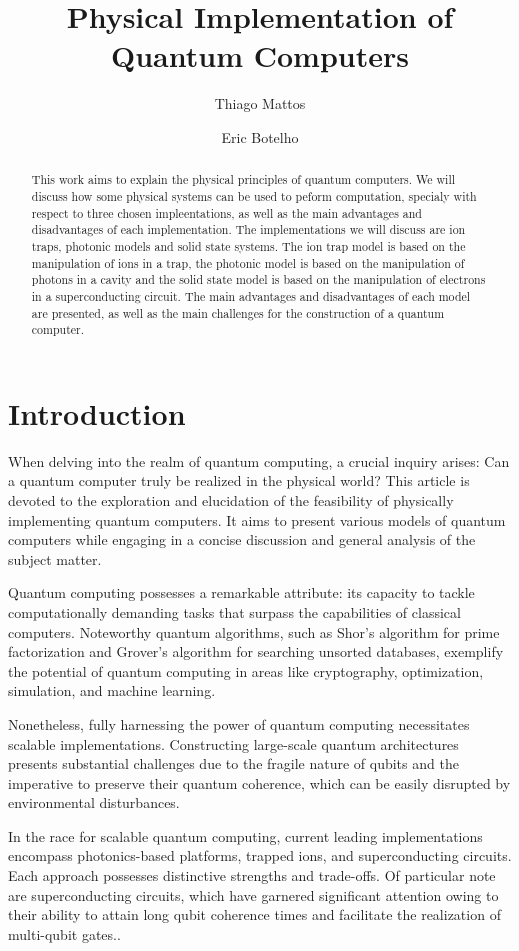 \documentclass[
  journal=largetwo,
  year=2023,
]{cup-journal}
\title{Physical Implementation of Quantum Computers}
\author{Thiago Mattos}
\affiliation{Universidade Federal de Minas Gerais, Departamento de Física, Belo Horizonte, 31270-901, Minas Gerais, Brazil}
\author{Eric Botelho}
\affiliation{Universidade Federal de Minas Gerais, Departamento de Física, Belo Horizonte, 31270-901, Minas Gerais, Brazil}
\begin{document}
\begin{abstract}
  This work aims to explain the physical principles of quantum computers. We will discuss how some physical systems can be used to peform computation, specialy with respect to three chosen impleentations, as well as the main advantages and disadvantages of each implementation.
  The implementations we will discuss are ion traps, photonic models and solid state systems. The ion trap model is based on the manipulation of ions in a trap, the photonic model is based on the manipulation of photons in a cavity and the solid state model is based on the manipulation of electrons in a superconducting circuit. The main advantages and disadvantages of each model are presented, as well as the main challenges for the construction of a quantum computer.

\end{abstract}

\section{Introduction}

When delving into the realm of quantum computing, a crucial inquiry arises: Can a quantum computer truly be realized in the physical world? This article is devoted to the exploration and elucidation of the feasibility of physically implementing quantum computers. It aims to present various models of quantum computers while engaging in a concise discussion and general analysis of the subject matter.

Quantum computing possesses a remarkable attribute: its capacity to tackle computationally demanding tasks that surpass the capabilities of classical computers. Noteworthy quantum algorithms, such as Shor's algorithm for prime factorization and Grover's algorithm for searching unsorted databases, exemplify the potential of quantum computing in areas like cryptography, optimization, simulation, and machine learning.

Nonetheless, fully harnessing the power of quantum computing necessitates scalable implementations. Constructing large-scale quantum architectures presents substantial challenges due to the fragile nature of qubits and the imperative to preserve their quantum coherence, which can be easily disrupted by environmental disturbances.

In the race for scalable quantum computing, current leading implementations encompass photonics-based platforms, trapped ions, and superconducting circuits. Each approach possesses distinctive strengths and trade-offs. Of particular note are superconducting circuits, which have garnered significant attention owing to their ability to attain long qubit coherence times and facilitate the realization of multi-qubit gates.\autocite{arute_2019_quantum}.
\end{document}
